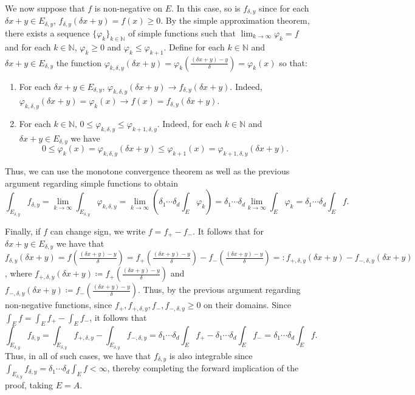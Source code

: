 We now suppose that \( f \) is non-negative on \( E \). In this case, so is \( f_{\delta ,y}  \) since for each \( \delta x + y \in E_{\delta ,y}  \), \( f_{\delta ,y} (\delta x + y ) = f(x) \geq 0 \). By the simple approximation theorem, there exists a sequence \( \{ \varphi _{k}  \}_{k \in \mathbb{N} }   \) of simple functions such that \( \lim_{{k} \to {\infty}} \varphi _{k} = f \) and for each \( k \in \mathbb{N}  \), \( \varphi _{k} \geq 0\) and \( \varphi _{k} \leq \varphi _{k+1}  \). Define for each \( k \in \mathbb{N}  \) and \( \delta x + y \in E_{\delta ,y}  \) the function \( \varphi_{k,\delta ,y} (\delta x + y) = \varphi _{k} (\frac{(\delta x + y )-y}{\delta } ) = \varphi _{k} (x) \) so that:
\begin{enumerate}
	\item For each \( \delta x + y \in E_{\delta ,y}  \), \( \varphi _{k,\delta ,y} (\delta  x + y) \to f_{\delta ,y} (\delta x + y) \). Indeed, \( \varphi _{k,\delta ,y} (\delta x + y) = \varphi _{k} (x) \to f(x) = f_{\delta ,y} (\delta x + y ) \).
\item For each \( k \in \mathbb{N}  \), \( 0 \leq \varphi _{k,\delta ,y} \leq \varphi _{k+1,\delta ,y}  \). Indeed, for each \( k \in \mathbb{N}  \) and \( \delta x + y \in E_{\delta ,y}  \) we have \[ 0 \leq \varphi _{k}(x)= \varphi _{k,\delta ,y} (\delta x + y) \leq \varphi _{k+1}(x) = \varphi _{k+1,\delta ,y} (\delta x + y).     \]
\end{enumerate}
Thus, we can use the monotone convergence theorem as well as the previous argument regarding simple functions to obtain \[\int_{E_{\delta ,y} } f_{\delta ,y} = \lim_{{k} \to {\infty}} \int_{E_{\delta ,y} } \varphi _{k,\delta ,y}  = \lim_{{k} \to {\infty}}\left (\delta_{1}\cdots\delta_{d}   \int_{E} \varphi _{k}  \right) = \delta_1\cdots\delta_{d} \lim_{{k} \to {\infty}} \int_{E} \varphi _{k} = \delta_1\cdots\delta_{d} \int_{E}f.\]

Finally, if \( f \) can change sign, we write \( f = f_{+} - f_{-}  \). It follows that for \( \delta x + y \in E_{\delta ,y}  \) we have that \( f_{\delta ,y}(\delta x + y) = f(\frac{(\delta x + y) - y}{\delta }) = f_{+}(\frac{(\delta x + y) - y}{\delta }) - f_{-}(\frac{(\delta x + y) - y}{\delta }) =: f_{+,\delta ,y} (\delta x + y )  - f_{-,\delta ,y} (\delta x + y)    \), where $f_{+,\delta ,y}(\delta x + y) \coloneqq f_{+}(\frac{(\delta x + y) - y}{\delta }) $ and \( f_{-,\delta ,y} (\delta x + y) \coloneqq f_{-}(\frac{(\delta x + y) - y}{\delta }) \). Thus, by the previous argument regarding non-negative functions, since \( f_{+},f_{+,\delta ,y},f_{-},f_{-,\delta ,y}     \geq 0 \) on their domains. Since \( \int_{E} f = \int_{E} f_{+} - \int_{E} f_{-}  \), it follows that \[\int_{E_{\delta ,y} } f_{\delta ,y} = \int_{E_{\delta ,y} } f_{+,\delta ,y} - \int_{E_{\delta ,y} } f_{-,\delta ,y} = \delta_1\cdots\delta_{d} \int_{E } f_{+} - \delta_1\cdots\delta_{d} \int_{E}f_{-} = \delta_1\cdots\delta_{d} \int_{E} f.       \] Thus, in all of such cases, we have that \( f_{\delta ,y}  \) is also integrable since \( \int_{E_{\delta ,y} } f_{\delta ,y} = \delta_1\cdots\delta_{d} \int_{E} f < \infty  \), thereby completing the forward implication of the proof, taking \( E = A \).\\

